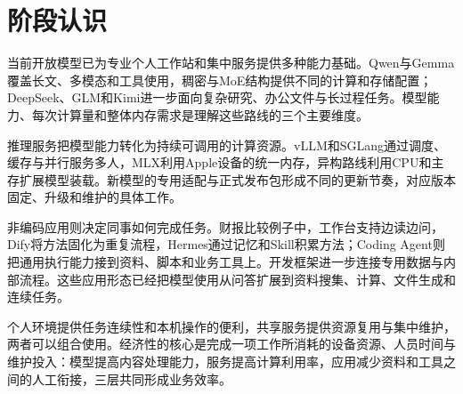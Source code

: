 \section{阶段认识}
当前开放模型已为专业个人工作站和集中服务提供多种能力基础。Qwen与Gemma覆盖长文、多模态和工具使用，稠密与MoE结构提供不同的计算和存储配置；DeepSeek、GLM和Kimi进一步面向复杂研究、办公文件与长过程任务。模型能力、每次计算量和整体内存需求是理解这些路线的三个主要维度。

推理服务把模型能力转化为持续可调用的计算资源。vLLM和SGLang通过调度、缓存与并行服务多人，MLX利用Apple设备的统一内存，异构路线利用CPU和主存扩展模型装载。新模型的专用适配与正式发布包形成不同的更新节奏，对应版本固定、升级和维护的具体工作。

非编码应用则决定同事如何完成任务。财报比较例子中，工作台支持边读边问，Dify将方法固化为重复流程，Hermes通过记忆和Skill积累方法；Coding Agent则把通用执行能力接到资料、脚本和业务工具上。开发框架进一步连接专用数据与内部流程。这些应用形态已经把模型使用从问答扩展到资料搜集、计算、文件生成和连续任务。

个人环境提供任务连续性和本机操作的便利，共享服务提供资源复用与集中维护，两者可以组合使用。经济性的核心是完成一项工作所消耗的设备资源、人员时间与维护投入：模型提高内容处理能力，服务提高计算利用率，应用减少资料和工具之间的人工衔接，三层共同形成业务效率。
